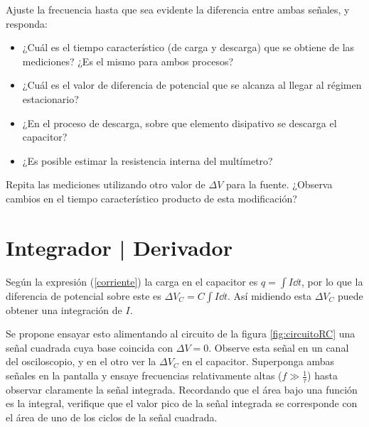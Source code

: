 \documentclass[laboratorio]{guia}
\begin{document}
Ajuste la frecuencia hasta que sea evidente la diferencia entre ambas señales, y responda:
\begin{itemize}
  \item ¿Cuál es el tiempo característico (de carga y descarga) que se obtiene de las  mediciones?
  ¿Es el mismo para ambos procesos?
  \item ¿Cuál es el valor de diferencia de potencial que se alcanza al llegar al régimen estacionario? 
  \item ¿En el proceso de descarga, sobre que elemento disipativo se descarga el capacitor?
  \item ¿Es posible estimar la resistencia interna del multímetro? 
\end{itemize}
Repita las mediciones utilizando otro valor de \(\Delta V\) para la fuente.
¿Observa cambios en el tiempo característico producto de esta modificación?


\section{Integrador | Derivador}
Según la expresión (\ref{corriente}) la carga en el capacitor es \(q= \int I \dd{t}\), por lo que la diferencia de potencial sobre este es \(\Delta V_C= C \int I \dd{t}\).
Así midiendo esta \(\Delta V_C\) puede obtener una integración de \(I\).

Se propone ensayar esto alimentando al circuito de la figura \ref{fig:circuitoRC} una señal cuadrada cuya base coincida con \(\Delta V= 0\).
Observe esta señal en un canal del osciloscopio, y en el otro ver la \(\Delta V_C\) en el capacitor.
Superponga ambas señales en la pantalla y ensaye frecuencias relativamente altas (\(f\gg \frac{1}{\tau}\)) hasta observar claramente la señal integrada.
Recordando que el área bajo una función es la integral, verifique que el valor pico de la señal integrada se corresponde con el área de uno de los ciclos de la señal cuadrada.
\end{document}
